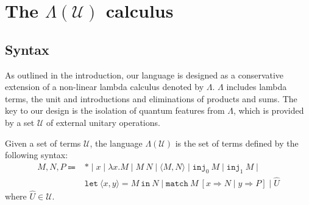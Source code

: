 \section{\texorpdfstring{The $\Lambda(\mathcal{U})$ calculus}{The Lambda(U) calculus}}
\subsection{Syntax}
As outlined in the introduction, our language is designed as a conservative extension of a non-linear lambda calculus denoted by $\Lambda$.
$\Lambda$ includes lambda terms, the unit and introductions and eliminations of products and sums.
The key to our design is the isolation of quantum features from $\Lambda$, which is provided by a set $\mathcal{U}$ of external unitary operations.
\begin{dfn}
  Given a set of terms $\mathcal{U}$, the language $\Lambda(\mathcal{U})$ is the set of terms defined by the following syntax:
  \begin{equation*}
    \begin{array}{rl}
      M, N, P \Coloneqq & *\mid x\mid\lambda x. M\mid M\ N\mid\langle M, N\rangle\mid\texttt{inj}_0\ M\mid\texttt{inj}_1\ M \mid \\& \texttt{let}\ \langle x, y\rangle=M\ \texttt{in}\ N\mid\texttt{match}\ M\ [x\Rightarrow N\mid y\Rightarrow P]\mid\hat{U}
    \end{array}
  \end{equation*}
  where $\hat{U}\in\mathcal{U}$.
\end{dfn}


